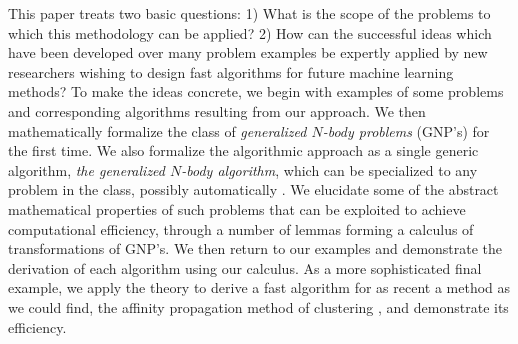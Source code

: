 \documentclass{article}
\begin{document}
This paper treats two basic questions: 1) What
is the scope of the problems to which this methodology can be applied? 2)
How can the successful ideas which have been developed over many problem 
examples be expertly applied by new researchers wishing to
design fast algorithms for future machine learning methods?
To make the ideas concrete, we begin with examples of some problems
and corresponding algorithms resulting from our approach.  We then
mathematically formalize the class of {\em generalized $N$-body
problems} (GNP's) for the first time.  We also formalize the
algorithmic approach as a single generic algorithm, {\em the
generalized $N$-body algorithm}, which can be specialized to any problem in the
class, possibly automatically \cite{autobayes}.
We elucidate some of
the abstract mathematical properties of such problems that can be
exploited to achieve computational efficiency, through a number of
lemmas forming a calculus of transformations of GNP's.  We then return
to our examples and demonstrate the derivation of each algorithm using
our calculus.  As a more sophisticated final example, we apply the
theory to derive a fast algorithm for as recent a method as we could
find, the affinity propagation method of clustering \cite{affinity}, and
demonstrate its efficiency.



%
%
%
%
\end{document}
